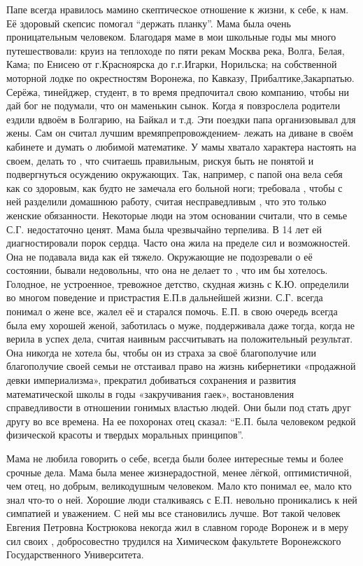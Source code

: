 Папе всегда нравилось мамино скептическое отношение к жизни, к себе, к нам. Её здоровый скепсис помогал “держать планку”. Мама была очень проницательным человеком.
Благодаря маме в мои школьные годы мы много путешествовали: круиз на теплоходе по пяти рекам Москва река, Волга, Белая, Кама; по Енисею от г.Красноярска до г.г.Игарки, Норильска; на собственной моторной лодке по окрестностям Воронежа, по Кавказу, Прибалтике,Закарпатью. Серёжа, тинейджер, студент, в то время предпочитал свою компанию, чтобы ни дай бог не подумали, что он маменькин сынок. Когда я повзрослела родители ездили вдвоём в Болгарию, на Байкал и т.д. Эти поездки папа организовывал для жены. Сам он считал лучшим времяпрепровождением- лежать на диване в своём кабинете и думать о любимой математике.
У мамы хватало характера настоять на своем, делать то , что считаешь правильным, рискуя быть не понятой и подвергнуться осуждению окружающих. Так, например, с папой она вела себя как со здоровым, как будто не замечала его больной ноги; требовала , чтобы с ней разделили домашнюю работу, считая несправедливым , что это только женские обязанности. Некоторые люди на этом основании считали, что в семье С.Г. недостаточно ценят.
Мама была чрезвычайно терпелива. В 14 лет ей диагностировали порок сердца. Часто она жила на пределе сил и возможностей. Она не подавала вида как ей тяжело. Окружающие не подозревали о её состоянии, бывали недовольны, что она не делает то , что им бы хотелось.
Голодное, не устроенное, тревожное детство, скудная жизнь с К.Ю. определили во многом поведение и пристрастия Е.П.в дальнейшей жизни. С.Г. всегда понимал о жене все, жалел её и старался помочь. Е.П. в свою очередь всегда была ему хорошей женой, заботилась о муже, поддерживала даже тогда, когда не верила в успех дела, считая наивным рассчитывать на положительный результат. Она никогда не хотела бы, чтобы он из страха за своё благополучие или благополучие своей семьи не отстаивал право на жизнь кибернетики «продажной девки империализма», прекратил добиваться сохранения и развития математической школы в годы «закручивания гаек», востановления справедливости в отношении гонимых властью людей. Они были под стать друг другу во все времена. На ее похоронах отец сказал: “Е.П. была человеком редкой физической красоты и твердых моральных принципов”.

Мама не любила говорить о себе, всегда были более интересные темы и более срочные дела. Мама была менее жизнерадостной, менее лёгкой, оптимистичной, чем отец, но добрым, великодушным человеком. Мало кто понимал ее, мало кто знал что-то о ней. Хорошие люди сталкиваясь с Е.П. невольно проникались к ней симпатией и уважением. С ней мы все становились лучше.
Вот такой человек Евгения Петровна Кострюкова некогда жил в славном городе Воронеж и в меру сил своих , добросовестно трудился на Химическом факультете Воронежского Государственного Университета.
